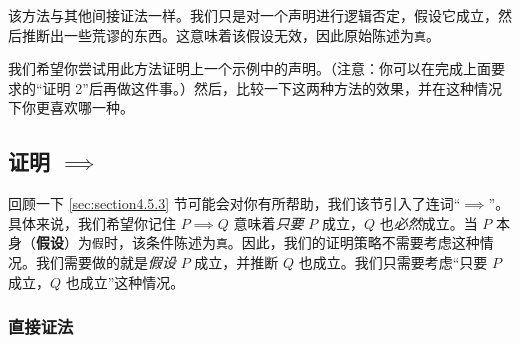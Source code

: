 该方法与其他间接证法一样。我们只是对一个声明进行逻辑否定，假设它成立，然后推断出一些荒谬的东西。这意味着该假设无效，因此原始陈述为\verb|真|。

我们希望你尝试用此方法证明上一个示例中的声明。（注意：你可以在完成上面要求的``证明 2''后再做这件事。）然后，比较一下这两种方法的效果，并在这种情况下你更喜欢哪一种。

\begin{center}
    \noindent {}
\end{center}

\subsection{证明 $\implies$}\label{sec:section4.9.5}

回顾一下 \ref{sec:section4.5.3} 节可能会对你有所帮助，我们该节引入了连词``$\implies$''。具体来说，我们希望你记住 $P \implies Q$ 意味着\emph{只要} $P$ 成立，$Q$ 也\emph{必然}成立。当 $P$ 本身（\textbf{假设}）为\verb|假|时，该条件陈述为\verb|真|。因此，我们的证明策略不需要考虑这种情况。我们需要做的就是\emph{假设} $P$ 成立，并推断 $Q$ 也成立。我们只需要考虑``只要 $P$ 成立，$Q$ 也成立''这种情况。

\subsubsection*{直接证法}

\begin{center}
    \noindent {}
\end{center}

